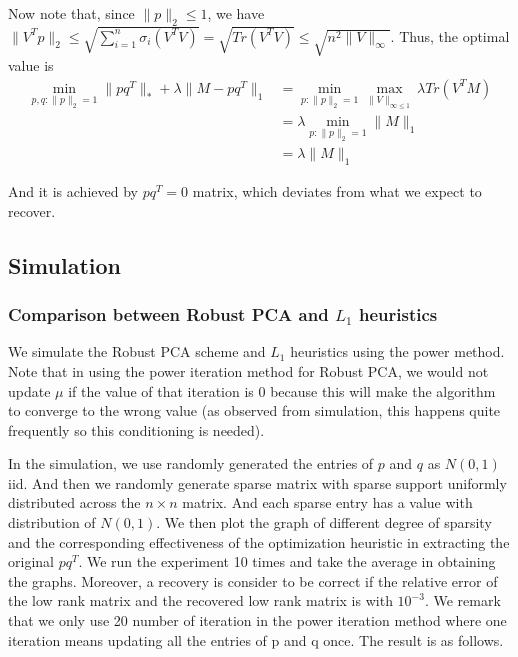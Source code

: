 Now note that, since $\|p\|_{2}\le1$, we have $\|V^{T}p\|_{2}\le\sqrt{\sum_{i=1}^{n}\sigma_{i}(V^{T}V)}=\sqrt{Tr(V^{T}V)}\le\sqrt{n^{2}\|V\|_{\infty}}$.
Thus, the optimal value is
\begin{align*}
\min_{p,q:\|p\|_{2}=1}\|pq^{T}\|_{*}+\lambda\|M-pq^{T}\|_{1}
& = \min_{p:\|p\|_{2}=1}\max_{\|V\|_{\infty\le1}}\lambda Tr(V^{T}M)\\
& = \lambda \min_{p:\|p\|_{2}=1}\|M\|_{1}\\
& = \lambda \|M\|_{1}
\end{align*}


And it is achieved by $pq^{T}=0$ matrix, which deviates from what
we expect to recover.


\subsection{Simulation }


\subsubsection{Comparison between Robust PCA and $L_{1}$ heuristics}

We simulate the Robust PCA scheme and $L_{1}$ heuristics using the power method. Note that in using the power iteration method for Robust PCA, we would not update $\mu$ if the value of that iteration is 0 because this will make the algorithm to converge to the wrong value (as observed from simulation, this happens quite frequently so this conditioning is needed).

In the simulation, we use randomly generated the entries of $p$ and $q$ as $N(0,1)$ iid. And then we randomly generate sparse matrix with sparse support uniformly distributed across the $n \times n$ matrix. And each sparse entry has a value with distribution of $N(0,1)$. We then plot the graph of different degree of sparsity and the corresponding effectiveness of the optimization heuristic in extracting the original $pq^{T}$. We run the experiment 10 times and take the average in obtaining the graphs. Moreover, a recovery is consider to be correct if the relative error of the low rank matrix and the recovered low rank matrix is with $10^{-3}$. We remark that we only use 20 number of iteration in the power iteration method where one iteration means updating all the entries of p and q once. The result is as follows.

